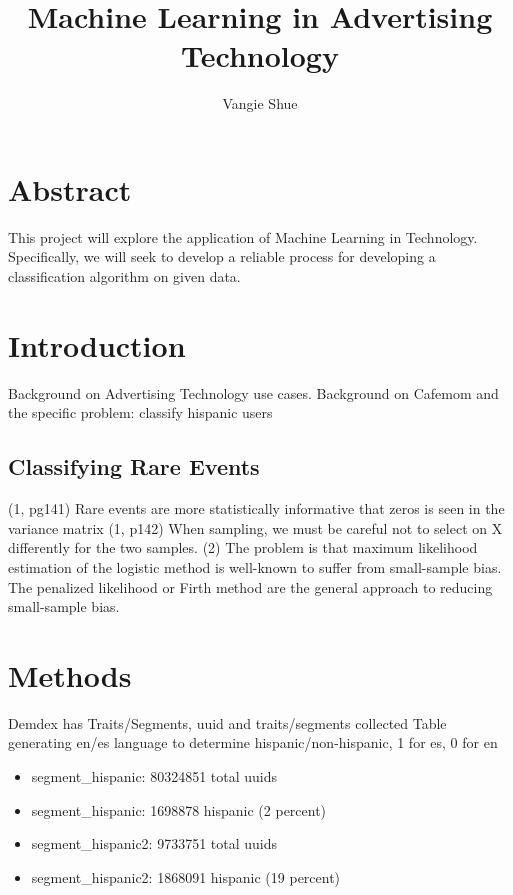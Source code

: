 \documentclass[a4paper]{article}
\title{Machine Learning in Advertising Technology}
\author{Vangie Shue}
\begin{document}


\maketitle
\section*{Abstract}
This project will explore the application of Machine Learning in Technology. Specifically, we will seek to develop a reliable process for developing a classification algorithm on given data.

\begin{multicols}{2}

\section*{Introduction}
Background on Advertising Technology use cases.
Background on Cafemom and the specific problem: classify hispanic users

\subsection*{Classifying Rare Events}
(1, pg141) Rare events are more statistically informative that zeros is seen in the variance matrix
(1, p142) When sampling, we must be careful not to select on X differently for the two samples.
(2) The problem is that maximum likelihood estimation of the logistic method is well-known to suffer from small-sample bias. The penalized likelihood or Firth method are the general approach to reducing small-sample bias.

\section*{Methods}
Demdex has Traits/Segments, uuid and traits/segments collected
Table generating en/es language to determine hispanic/non-hispanic, 1 for es, 0 for en
\begin{itemize}
  \item segment\_hispanic: 80324851 total uuids
  \item segment\_hispanic: 1698878 hispanic (2 percent)
  \item segment\_hispanic2: 9733751 total uuids
  \item segment\_hispanic2: 1868091 hispanic (19 percent)
\end{itemize}


\end{multicols}
\end{document}
